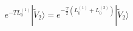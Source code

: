 \begin{equation} %
e^{-T L_0^{(1)}} |\tilde{V}_2 \rangle = e^{-\frac{T}{2}(
  L_0^{(1)}+L_0^{(2)})} |\tilde{V}_2 \rangle
\end{equation} 

